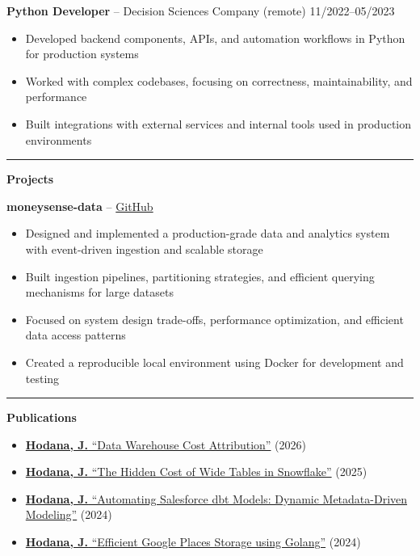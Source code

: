 \documentclass[11pt,a4paper]{article}
\begin{document}
\textbf{Python Developer} -- Decision Sciences Company (remote) \hfill 11/2022--05/2023
\begin{itemize}
\item Developed backend components, APIs, and automation workflows in Python for production systems
\item Worked with complex codebases, focusing on correctness, maintainability, and performance
\item Built integrations with external services and internal tools used in production environments
\end{itemize}

\rule{\textwidth}{0.5pt}

\textbf{Projects}

\textbf{moneysense-data} -- \href{https://github.com/joachimhodana/moneysense-data}{GitHub}
\begin{itemize}
\item Designed and implemented a production-grade data and analytics system with event-driven ingestion and scalable storage
\item Built ingestion pipelines, partitioning strategies, and efficient querying mechanisms for large datasets
\item Focused on system design trade-offs, performance optimization, and efficient data access patterns
\item Created a reproducible local environment using Docker for development and testing
\end{itemize}

\rule{\textwidth}{0.5pt}

\textbf{Publications}

\begin{itemize}
\item \href{https://medium.com/lortech-solutions-technical-blog/no-idea-where-your-data-warehouse-spend-goes-7d600666993e}{\textbf{Hodana, J.} ``Data Warehouse Cost Attribution''} (2026)
\item \href{https://medium.com/lortech-solutions-technical-blog/the-hidden-cost-of-wide-tables-in-snowflake-ab4757902c57}{\textbf{Hodana, J.} ``The Hidden Cost of Wide Tables in Snowflake''} (2025)
\item \href{https://medium.com/lortech-solutions-technical-blog/automating-salesforce-dbt-models-dynamic-metadata-driven-modeling-df3fe2498da2}{\textbf{Hodana, J.} ``Automating Salesforce \textrightarrow{} dbt Models: Dynamic Metadata-Driven Modeling''} (2024)
\item \href{https://medium.com/lortech-solutions-technical-blog/how-i-managed-to-efficiently-store-google-places-in-my-database-without-blowing-the-budget-7abca28637a8}{\textbf{Hodana, J.} ``Efficient Google Places Storage using Golang''} (2024)
\end{itemize}
\end{document}

